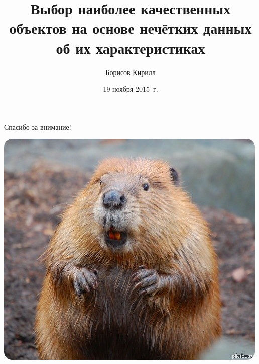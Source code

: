 



\title[Субъект. суждения и принятие решений]{Выбор наиболее качественных объектов на основе нечётких данных об их характеристиках}
\author{Борисов Кирилл}

\date{19 ноября 2015~г.}


\sloppy

\maketitle





\begin{frame}{Спасибо за внимание!}
	\begin{center}
		\includegraphics[width=0.5\linewidth]{./pic/biber_final}
	\end{center}
\end{frame}



